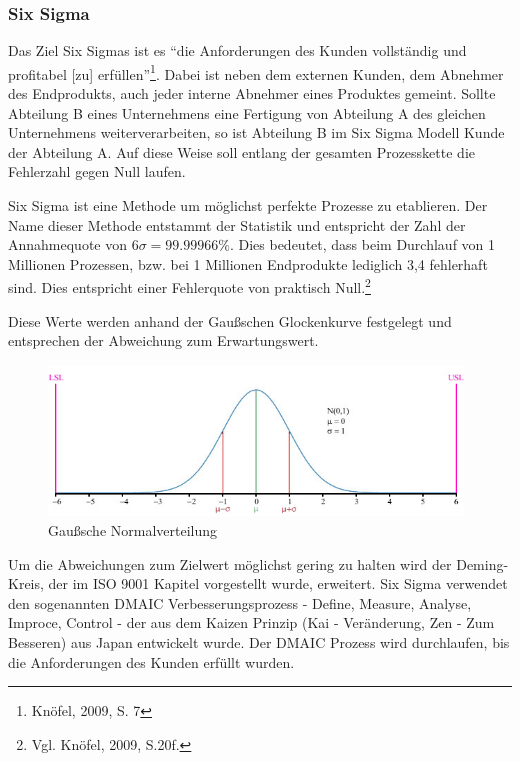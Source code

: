             \subsubsection{Six Sigma}
            \label{subsec:sixsigma}

            Das Ziel Six Sigmas ist es \enquote{die Anforderungen des Kunden vollständig und profitabel [zu] erfüllen}\footnote{Knöfel, 2009, S. 7}. Dabei ist neben dem externen Kunden, dem Abnehmer des Endprodukts, auch jeder interne Abnehmer eines Produktes gemeint. Sollte Abteilung B eines Unternehmens eine Fertigung von Abteilung A des gleichen Unternehmens weiterverarbeiten, so ist Abteilung B im Six Sigma Modell Kunde der Abteilung A. Auf diese Weise soll entlang der gesamten Prozesskette die Fehlerzahl gegen Null laufen.

            Six Sigma ist eine Methode um möglichst perfekte Prozesse zu etablieren. Der Name dieser Methode entstammt der Statistik und entspricht der Zahl der Annahmequote von $6\sigma = 99.99966\%$. Dies bedeutet, dass beim Durchlauf von 1 Millionen Prozessen, bzw. bei 1 Millionen Endprodukte lediglich 3,4 fehlerhaft sind. Dies entspricht einer Fehlerquote von praktisch Null.\footnote{Vgl. Knöfel, 2009, S.20f.}

            Diese Werte werden anhand der Gaußschen Glockenkurve festgelegt und entsprechen der Abweichung zum Erwartungswert.

            \begin{figure}[!htbp]
                \begin{center}
                    \includegraphics[width=11cm]{Abbildungen/sixs_normalverteilung}
                    \caption{Gaußsche Normalverteilung\protect\footnotemark}
                    \label{abb:normalverteilung}
                \end{center}
            \end{figure}


            Um die Abweichungen zum Zielwert möglichst gering zu halten wird der Deming-Kreis, der im ISO 9001 Kapitel vorgestellt wurde, erweitert. Six Sigma verwendet den sogenannten DMAIC Verbesserungsprozess - Define, Measure, Analyse, Improce, Control - der aus dem Kaizen Prinzip (Kai - Veränderung, Zen - Zum Besseren) aus Japan entwickelt wurde. Der DMAIC Prozess wird durchlaufen, bis die Anforderungen des Kunden erfüllt wurden.

